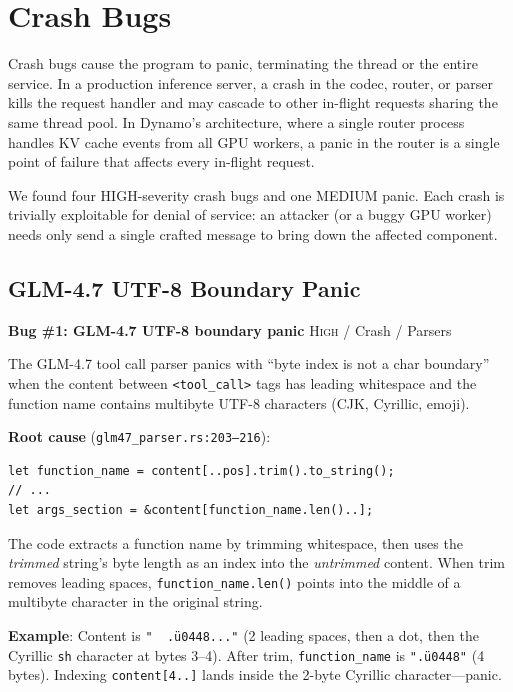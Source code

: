 \section{Crash Bugs}
\label{sec:findings:crashes}

Crash bugs cause the program to panic, terminating the thread or the entire service. In a production inference server, a crash in the codec, router, or parser kills the request handler and may cascade to other in-flight requests sharing the same thread pool. In Dynamo's architecture, where a single router process handles KV cache events from all GPU workers, a panic in the router is a single point of failure that affects every in-flight request.

We found four HIGH-severity crash bugs and one MEDIUM panic. Each crash is trivially exploitable for denial of service: an attacker (or a buggy GPU worker) needs only send a single crafted message to bring down the affected component.

\subsection{GLM-4.7 UTF-8 Boundary Panic}

\begin{bugbox}
\textbf{Bug \#1: GLM-4.7 UTF-8 boundary panic} \hfill \textsc{High} / Crash / Parsers

The GLM-4.7 tool call parser panics with ``byte index is not a char boundary'' when the content between \texttt{<tool\_call>} tags has leading whitespace and the function name contains multibyte UTF-8 characters (CJK, Cyrillic, emoji).

\medskip
\textbf{Root cause} (\texttt{glm47\_parser.rs:203--216}):
\begin{verbatim}
let function_name = content[..pos].trim().to_string();
// ...
let args_section = &content[function_name.len()..];
\end{verbatim}

The code extracts a function name by trimming whitespace, then uses the \emph{trimmed} string's byte length as an index into the \emph{untrimmed} content. When trim removes leading spaces, \texttt{function\_name.len()} points into the middle of a multibyte character in the original string.

\medskip
\textbf{Example}: Content is \texttt{"~~.{\"u0448}..."} (2 leading spaces, then a dot, then the Cyrillic \texttt{sh} character at bytes 3--4). After trim, \texttt{function\_name} is \texttt{".{\"u0448}"} (4 bytes). Indexing \texttt{content[4..]} lands inside the 2-byte Cyrillic character---panic.
\end{bugbox}

